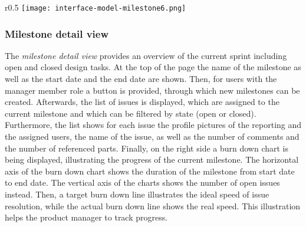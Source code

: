 \begin{wrapfigure}{r}{0.5\textwidth}
    \centering
    \texttt{[image: interface-model-milestone6.png]}
    \label{fig:screenshot-milestone}
\end{wrapfigure}

\subsubsection{Milestone detail view}

The \textit{milestone detail view} provides an overview of the current sprint including open and closed design tasks.
At the top of the page the name of the milestone as well as the start date and the end date are shown.
Then, for users with the manager member role a button is provided, through which new milestones can be created.
Afterwards, the list of issues is displayed, which are assigned to the current milestone and which can be filtered by state (open or closed).
Furthermore, the list shows for each issue the profile pictures of the reporting and the assigned users, the name of the issue, as well as the number of comments and the number of referenced parts.
Finally, on the right side a burn down chart is being displayed, illustrating the progress of the current milestone.
The horizontal axis of the burn down chart shows the duration of the milestone from start date to end date.
The vertical axis of the charts shows the number of open issues instead.
Then, a target burn down line illustrates the ideal speed of issue resolution, while the actual burn down line shows the real speed.
This illustration helps the product manager to track progress.